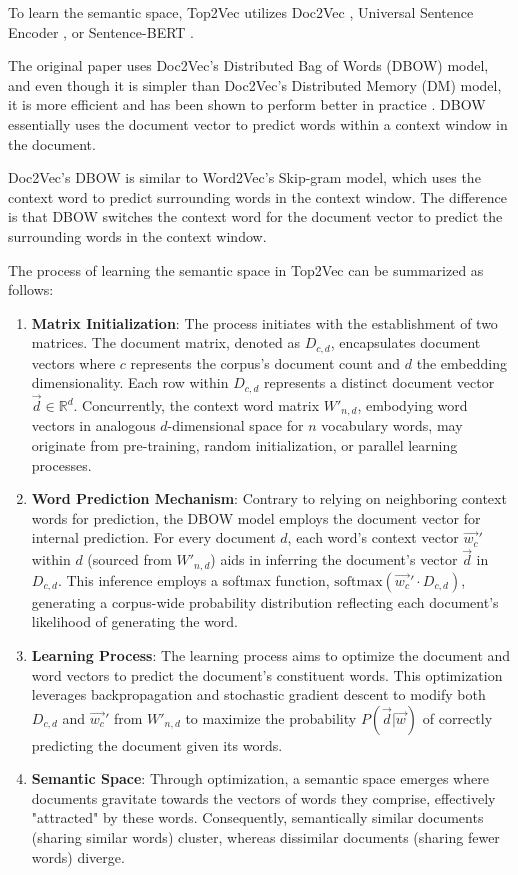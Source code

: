 \documentclass{article}
\begin{document}
To learn the semantic space, Top2Vec utilizes Doc2Vec \cite{le_distributed_2014, rehurek_software_2010}, Universal Sentence Encoder \cite{cer_universal_2018}, or Sentence-BERT \cite{reimers_sentence-bert_2019}. 

The original paper uses Doc2Vec's Distributed Bag of Words (DBOW) model, and even though it is simpler than Doc2Vec's Distributed Memory (DM) model, it is more efficient and has been shown to perform better in practice \cite{lau_empirical_2016}. DBOW essentially uses the document vector to predict words within a context window in the document.

Doc2Vec's DBOW is similar to Word2Vec's Skip-gram model, which uses the context word to predict surrounding words in the context window. The difference is that DBOW switches the context word for the document vector to predict the surrounding words in the context window.

The process of learning the semantic space in Top2Vec can be summarized as follows:
\begin{enumerate}
    \item \textbf{Matrix Initialization}: The process initiates with the establishment of two matrices. The document matrix, denoted as $D_{c,d}$, encapsulates document vectors where $c$ represents the corpus's document count and $d$ the embedding dimensionality. Each row within $D_{c,d}$ represents a distinct document vector $\vec{d} \in \mathbb{R}^d$. Concurrently, the context word matrix $W'_{n,d}$, embodying word vectors in analogous $d$-dimensional space for $n$ vocabulary words, may originate from pre-training, random initialization, or parallel learning processes.

    \item \textbf{Word Prediction Mechanism}: Contrary to relying on neighboring context words for prediction, the DBOW model employs the document vector for internal prediction. For every document $d$, each word's context vector $\vec{w_c}'$ within $d$ (sourced from $W'_{n,d}$) aids in inferring the document's vector $\vec{d}$ in $D_{c,d}$. This inference employs a softmax function, $\text{softmax}(\vec{w_c}' \cdot D_{c,d})$, generating a corpus-wide probability distribution reflecting each document's likelihood of generating the word.

    \item \textbf{Learning Process}: The learning process aims to optimize the document and word vectors to predict the document's constituent words. This optimization leverages backpropagation and stochastic gradient descent to modify both $D_{c,d}$ and $\vec{w_c}'$ from $W'_{n,d}$ to maximize the probability $P(\vec{d} | \vec{w})$ of correctly predicting the document given its words.

    \item \textbf{Semantic Space}: Through optimization, a semantic space emerges where documents gravitate towards the vectors of words they comprise, effectively "attracted" by these words. Consequently, semantically similar documents (sharing similar words) cluster, whereas dissimilar documents (sharing fewer words) diverge.
\end{enumerate}
\end{document}
